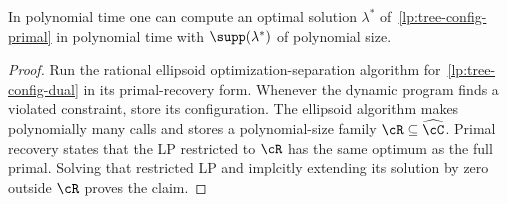 \begin{lemma}\label{lem:tree-config-primal-recovery}
    In polynomial time one can compute an optimal solution $\lambda^*$ of~\eqref{lp:tree-config-primal} in polynomial time with $\supp(\lambda^*)$ of polynomial size.
\end{lemma}
\begin{proof}
    Run the rational ellipsoid optimization-separation algorithm for~\eqref{lp:tree-config-dual} in its primal-recovery form. Whenever the dynamic program finds a violated constraint, store its configuration. The ellipsoid algorithm makes polynomially many calls and stores a polynomial-size family $\cR\subseteq\widehat\cC$. Primal recovery states that the LP restricted to $\cR$ has the same optimum as the full primal. Solving that restricted LP and implcitly extending its solution by zero outside $\cR$ proves the claim.
\end{proof}

